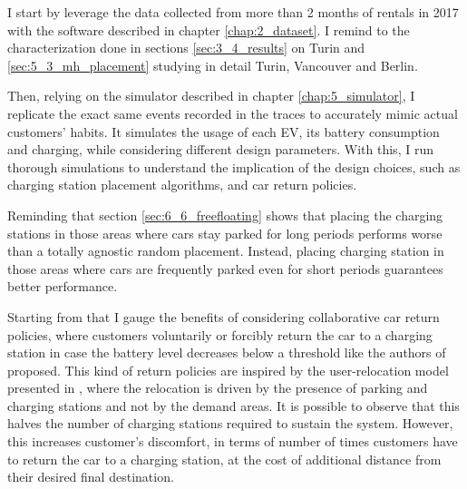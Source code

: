 
I start by leverage the data collected from more than 2 months of rentals in 2017 with the software described in chapter \ref{chap:2_dataset}. I remind to the characterization done in sections \ref{sec:3_4_results} on Turin and \ref{sec:5_3_mh_placement} studying in detail Turin, Vancouver and Berlin. 

Then, relying on the simulator described in chapter \ref{chap:5_simulator}, I replicate the exact same events recorded in the traces to accurately mimic actual customers' habits. It simulates the usage of each EV, its battery consumption and charging, while considering different design parameters. With this, I run thorough simulations to understand the implication of the design choices, such as charging station placement algorithms, and car return policies.

Reminding that section \ref{sec:6_6_freefloating} shows that placing the charging stations in those areas where cars stay parked for long periods performs worse than a totally agnostic random placement. Instead, placing charging station in those areas where cars are frequently parked even for short periods guarantees  better performance.

Starting from that I gauge the benefits of considering collaborative car return policies, where customers voluntarily or forcibly return the car to a charging station in case the battery level decreases below a  threshold like the authors of \cite{2_FlathIlgWeinhardt_2012} proposed. This kind of return policies are inspired by the user-relocation model presented in \cite{1_BrendelBrennecke_2015, 6_BrendelLichtenberg_2017,7_BrendelRockenkamm_2015,8_Wagner2015DataAF}, where the relocation is driven by the presence of parking and charging stations and not by the demand areas.
It is possible to observe that this halves the number of charging stations required to sustain the system. However, this increases customer's discomfort, in terms of number of times customers have to return the car to a charging station, at the cost of additional distance from their desired final destination. 

